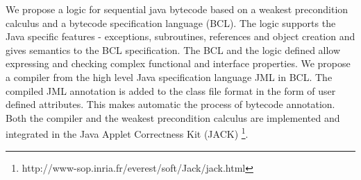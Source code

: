 

We propose a logic for sequential java bytecode based on a weakest precondition calculus and a bytecode specification language (BCL). 
The logic supports the Java specific features - exceptions, subroutines, references and object creation and gives semantics to the BCL specification. The BCL and the logic defined  allow expressing and checking complex functional and interface properties. We propose a compiler from the high level Java specification language JML in BCL. The compiled JML annotation is added to the class file format in the form of user defined attributes. This makes automatic the process of bytecode annotation.  Both the compiler and the weakest precondition calculus are implemented and integrated in the Java Applet Correctness Kit (JACK) \footnote{http://www-sop.inria.fr/everest/soft/Jack/jack.html}.


